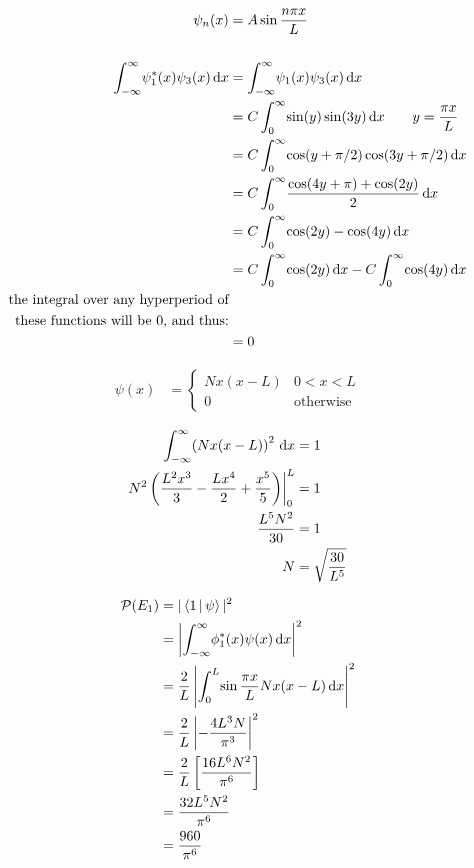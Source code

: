 \documentclass[12pt]{article}
\begin{document}
\newpage
{}
\problem
\begin{align*}
\psi_n(x) &= A\sin\frac{n\pi x}{L} \\
\\
\int_{-\infty}^{\infty} \! \psi_1^*(x)\psi_3(x) \, \d x &= \int_{-\infty}^{\infty} \! \psi_1(x)\psi_3(x) \, \d x \\
&= C\int_{0}^{\infty} \! \sin(y)\sin(3y) \, \d x \qquad y = \frac{\pi x}{L} \\
&= C\int_{0}^{\infty} \! \cos(y+\pi/2)\cos(3y+\pi/2) \, \d x \\
&= C\int_{0}^{\infty} \! \frac{\cos(4y+\pi)+\cos(2y)}{2} \, \d x \\
&= C\int_{0}^{\infty} \! \cos(2y)-\cos(4y) \, \d x \\
&= C\int_{0}^{\infty} \! \cos(2y) \, \d x - C\int_{0}^{\infty} \! \cos(4y) \, \d x \\
\text{the integral over any hyperperiod of}& \\
\text{these functions will be 0, and thus:}& \\
&= 0
\end{align*}




\problemasub
\begin{align*}
\psi(x) &= \begin{cases}
Nx(x-L) & 0 < x < L \\
0 & \text{otherwise}
\end{cases}\\
\end{align*}
\begin{align*}
\int_{-\infty}^{\infty} \! \left(Nx(x-L)\right)^2 \, \mathrm{d} x &= 1 \\
N^2\left( \frac{L^2x^3}{3} - \frac{Lx^4}{2} + \frac{x^5}{5} \right) \biggr |_0^L &= 1 \\
\frac{L^5N^2}{30} &= 1 \\
N &= \sqrt{\frac{30}{L^5}}
\end{align*}

\newpage
\problemasub
\begin{align*}
\mathcal{P}(E_1) &= |\Braket{1|\psi}|^2 \\
&= \left|\int_{-\infty}^{\infty}\! \phi_1^*(x) \psi(x) \, \mathrm{d} x\right|^2 \\
&= \frac{2}{L} \left|\int_{0}^{L}\! \sin\frac{\pi x}{L} Nx(x -L) \, \mathrm{d} x\right|^2 \\
&= \frac{2}{L} \left| - \frac{4L^3N}{\pi^3} \right|^2 \\
&= \frac{2}{L} \left[ \frac{16L^6N^2}{\pi^6} \right] \\
&= \frac{32L^5N^2}{\pi^6} \\
&= \frac{960}{\pi^6} \\
\end{align*}
\end{document}
